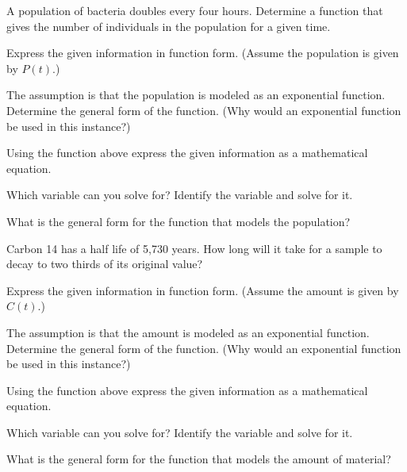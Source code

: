 \begin{problem}
\item A population of bacteria doubles every four hours. Determine a
  function that gives the number of individuals in the population for
  a given time.
  \begin{subproblem}
  \item Express the given information in function form. (Assume the
    population is given by $P(t)$.)
    \vfill
  \item The assumption is that the population is modeled as an
    exponential function. Determine the general form of the
    function. (Why would an exponential function be used in this
    instance?)  
    \vfill
  \item Using the function above express the given information as a
    mathematical equation.
    \vfill
  \item Which variable can you solve for? Identify the variable and
    solve for it.
    \vfill
  \item What is the general form for the function that models the
    population?
    \vspace{1em}
  \end{subproblem}

\clearpage

\item Carbon 14 has a half life of 5,730 years. How long will it take
  for a sample to decay to two thirds of its original value?
  \begin{subproblem}
  \item Express the given information in function form. (Assume the
    amount is given by $C(t)$.)
    \vfill
  \item The assumption is that the amount is modeled as an
    exponential function. Determine the general form of the function. (Why
    would an exponential function be used in this instance?)
    \vfill
  \item Using the function above express the given information as a
    mathematical equation.
    \vfill
  \item Which variable can you solve for? Identify the variable and
    solve for it.
    \vfill
  \item What is the general form for the function that models the
    amount of material?
    \vspace{1em}
  \end{subproblem}

\clearpage



\end{problem}

